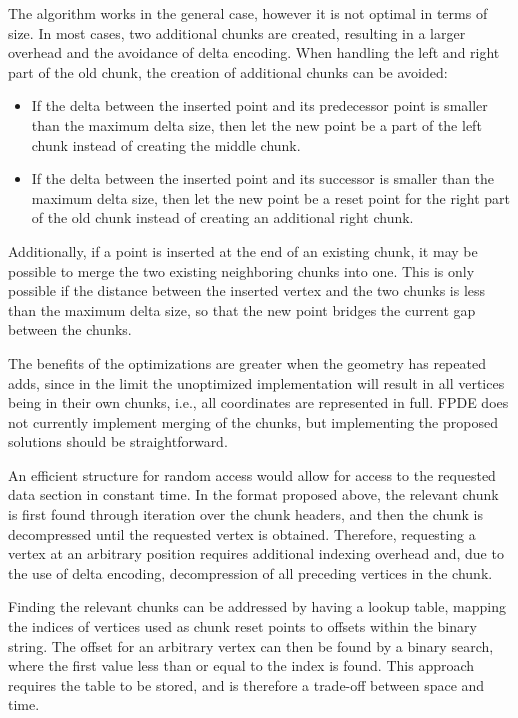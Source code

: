 The algorithm works in the general case, however it is not optimal in terms of size. In most cases, two additional chunks are created, resulting in a larger overhead and the avoidance of delta encoding. When handling the left and right part of the old chunk, the creation of additional chunks can be avoided:
\begin{itemize}
    \item If the delta between the inserted point and its predecessor point is smaller than the maximum delta size, then let the new point be a part of the left chunk instead of creating the middle chunk.
    \item If the delta between the inserted point and its successor is smaller than the maximum delta size, then let the new point be a reset point for the right part of the old chunk instead of creating an additional right chunk.
\end{itemize}

Additionally, if a point is inserted at the end of an existing chunk, it may be possible to merge the two existing neighboring chunks into one. This is only possible if the distance between the inserted vertex and the two chunks is less than the maximum delta size, so that the new point bridges the current gap between the chunks.


The benefits of the optimizations are greater when the geometry has repeated adds, since in the limit the unoptimized implementation will result in all vertices being in their own chunks, i.e., all coordinates are represented in full. FPDE does not currently implement merging of the chunks, but implementing the proposed solutions should be straightforward.

\label{sec:optrandom}
An efficient structure for random access would allow for access to the requested data section in constant time. In the format proposed above, the relevant chunk is first found through iteration over the chunk headers, and then the chunk is decompressed until the requested vertex is obtained. Therefore, requesting a vertex at an arbitrary position requires additional indexing overhead and, due to the use of delta encoding, decompression of all preceding vertices in the chunk.

Finding the relevant chunks can be addressed by having a lookup table, mapping the indices of vertices used as chunk reset points to offsets within the binary string. The offset for an arbitrary vertex can then be found by a binary search, where the first value less than or equal to the index is found. This approach requires the table to be stored, and is therefore a trade-off between space and time.

